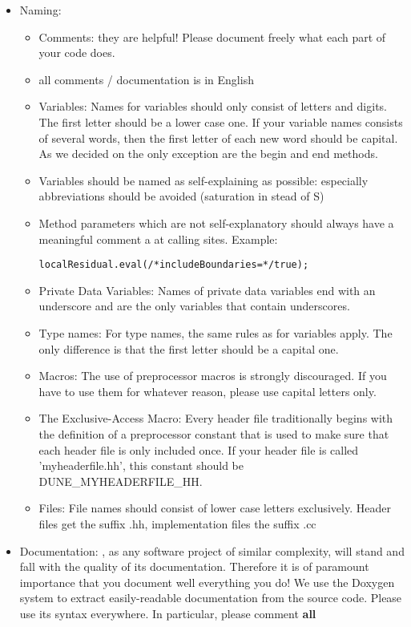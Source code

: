 \begin{itemize}
\item Naming: 
\begin{itemize}
\item Comments: they are helpful! Please document freely what each part of your code does. 
\item all comments / documentation is in English
\item Variables: Names for variables should only consist of letters and digits. The first
letter should be a lower case one. If your variable names consists of several words, then 
the first letter of each new word should be capital. As we decided on the only exception 
are the begin and end methods.
\item Variables should be named as self-explaining as possible: especially abbreviations 
should be avoided (saturation in stead of S)
\item Method parameters which are not self-explanatory should always
  have a meaningful comment a at calling sites. Example:
\begin{lstlisting}[style=DumuxCode]
   localResidual.eval(/*includeBoundaries=*/true);
\end{lstlisting}
\item Private Data Variables: Names of private data variables end with an underscore and are the only variables that contain underscores. 
\item Type names: For type names, the same rules as for variables apply. The only difference is that the first letter should be a capital one.
\item Macros: The use of preprocessor macros is strongly discouraged. If you have to use them for whatever reason, please use capital letters only.
\item The Exclusive-Access Macro: Every header file traditionally begins with the definition of a preprocessor constant that is used to make sure that each header file is only included once. If your header file is called 'myheaderfile.hh', this constant should be DUNE\_MYHEADERFILE\_HH.
\item Files: File names should consist of lower case letters exclusively. Header files get the suffix .hh, implementation files the suffix .cc
\end{itemize}
\item Documentation:
      \Dumux, as any software project of similar complexity, will stand and fall with the quality of its documentation.
Therefore it is of paramount importance that you document well everything you do! We use the Doxygen system to extract easily-readable documentation from the source code. Please use its syntax everywhere. In particular, please comment \textbf{all}

\end{itemize}
